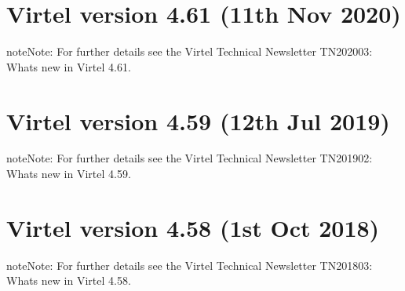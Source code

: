 \documentclass[letterpaper,10pt,english]{sphinxmanual}
\begin{document}
\section{Virtel version 4.61 (11th Nov 2020)}
\label{\detokenize{Installation_Guide:virtel-version-4-60-11th-nov-2020}}
\begin{sphinxadmonition}{note}{Note:}
For further details see the Virtel Technical Newsletter TN202003: Whats new in Virtel 4.61.
\end{sphinxadmonition}


\section{Virtel version 4.59 (12th Jul 2019)}
\label{\detokenize{Installation_Guide:virtel-version-4-59-12th-jul-2019}}
\begin{sphinxadmonition}{note}{Note:}
For further details see the Virtel Technical Newsletter TN201902: Whats new in Virtel 4.59.
\end{sphinxadmonition}


\section{Virtel version 4.58 (1st Oct 2018)}
\label{\detokenize{Installation_Guide:virtel-version-4-58-1st-oct-2018}}
\begin{sphinxadmonition}{note}{Note:}
For further details see the Virtel Technical Newsletter TN201803: Whats new in Virtel 4.58.
\end{sphinxadmonition}
\end{document}
